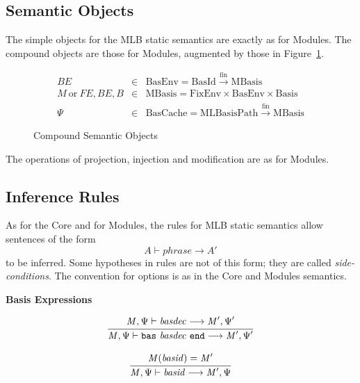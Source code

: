 \documentclass[draft]{article}
\renewcommand{\mit}[1]{\mathit{#1}}
\newcommand{\mrm}[1]{\mathrm{#1}}
\newcommand{\mtt}[1]{\mathtt{#1}}
\newcommand{\infrule}[2]{{\frac{\displaystyle\strut{#1}}{\displaystyle\strut{#2}}}}
\newcommand{\judge}[2]{\infrule{#1}{#2}}
\begin{document}
\subsection{Semantic Objects}
The simple objects for the MLB static semantics are exactly as for
Modules.  The compound objects are those for Modules, augmented by
those in Figure~\ref{fig:mlb:SS:CompoundObjects}.
\begin{figure}[h]
\begin{displaymath}
\begin{array}{rcl}
\mit{BE} & \in & \mrm{BasEnv} = \mrm{BasId} \xrightarrow{\mrm{fin}} \mrm{MBasis} \\
\mit{M} ~\mrm{or}~ \mit{FE},\mit{BE},\mit{B} & \in & 
\mrm{MBasis} = \mrm{FixEnv} \times \mrm{BasEnv} \times \mrm{Basis} \\
\Psi & \in & \mrm{BasCache} = \mrm{MLBasisPath} \xrightarrow{\mrm{fin}} \mrm{MBasis} 
\end{array}
\end{displaymath}
\caption{Compound Semantic Objects}\label{fig:mlb:SS:CompoundObjects}
\end{figure}
The operations of projection, injection and modification are as for
Modules.
%
\subsection{Inference Rules}
As for the Core and for Modules, the rules for MLB static semantics
allow sentences of the form
\begin{displaymath}
A \vdash \mit{phrase} \longrightarrow A'
\end{displaymath}
to be inferred.  Some hypotheses in rules are not of this form; they
are called \emph{side-conditions}.  The convention for options is as
in the Core and Modules semantics.

\vspace{2\parsep}
{\large\noindent
\textbf{Basis Expressions} \hfill
\fbox{$\mit{M}, \Psi \vdash \mit{basexp} \longrightarrow \mit{M}', \Psi'$}
}\nopagebreak

\begin{equation}
\judge{
\mit{M}, \Psi \vdash \mit{basdec} \longrightarrow \mit{M}', \Psi'
}{
\mit{M}, \Psi \vdash \mtt{bas}~ \mit{basdec} ~\mtt{end} \longrightarrow \mit{M}', \Psi'
}
\end{equation}

\begin{equation}
\judge{
\mit{M}(\mit{basid}) = \mit{M}'
}{
\mit{M}, \Psi \vdash \mit{basid} \longrightarrow \mit{M}', \Psi
}
\end{equation}
\end{document}
